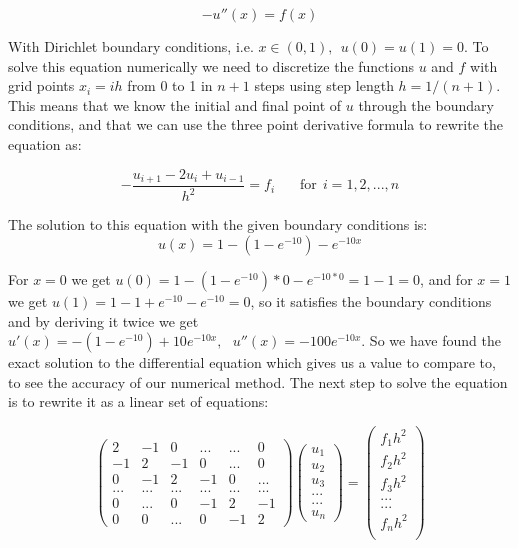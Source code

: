 \documentclass[a4paper,11pt]{article}
\begin{document}
{\begin{equation}
	- u''(x) = f(x)
	\label{diff_eq}
\end{equation}
	
With Dirichlet boundary conditions, i.e. $ x \in (0,1), \: \: u(0) = u(1) = 0$. To solve this equation numerically we need to discretize the functions $u$ and $f$ with grid points $x_i = i h$ from 0 to 1 in $n+1$ steps using step length $h = 1/(n+1)$. This means that we know the initial and final point of $u$ through the boundary conditions, and that we can use the three point derivative formula to rewrite the equation as:
		
\begin{equation}
	- \frac{u_{i+1} - 2u_i + u_{i-1}}{h^2} = f_i \: \: \: \: \: \: \: \: \text{for} \: \: i = 1, 2, ... , n
	\label{disc_diff_eq}
\end{equation}
		
The solution to this equation with the given boundary conditions is: 
\begin{equation}
u(x) = 1 - (1-e^{-10}) - e^{-10x}
\label{exact_solution}
\end{equation}

For $x = 0$ we get $u(0) = 1 - (1 - e^{-10})*0 - e^{-10 * 0} = 1-1 = 0$, and for $x = 1$ we get $u(1) = 1 - 1 + e^{-10} - e^{-10} = 0$, so it satisfies the boundary conditions and by deriving it twice we get $u'(x) = -(1-e^{-10}) + 10e^{-10x}, \: \: \: u''(x) = -100 e^{-10x}$. So we have found the exact solution to the differential equation which gives us a value to compare to, to see the accuracy of our numerical method. The next step to solve the equation is to rewrite it as a linear set of equations:
		
\begin{equation}
\begin{pmatrix}
	2 & -1 & 0 & ... & ... & 0 \\
	-1 & 2 & -1 & 0 & ... & 0 \\
	0 & -1 & 2 & -1 & 0 & ... \\
	... & ... & ... & ... & ... & ... \\
	0 & ... & 0 & -1 & 2 & -1 \\
	0 & 0 & ... & 0 & -1 & 2 
	\end{pmatrix} \begin{pmatrix}
	u_1\\
	u_2\\
	u_3\\
	...\\
	...\\
	u_n
	\end{pmatrix} = \begin{pmatrix}
	f_1 h^2 \\
	f_2 h^2 \\
	f_3 h^2 \\
	... \\
	... \\
	f_n h^2 \\
	\end{pmatrix}
\end{equation}
		
}
\end{document}
